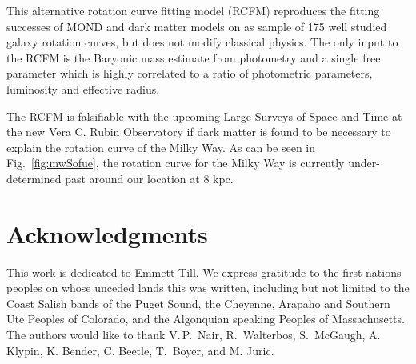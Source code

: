 \documentclass[reprint,%
 amsmath,amssymb,
 aps,
]{revtex4-1}
\begin{document}
  This alternative rotation curve fitting model (RCFM)   reproduces the fitting successes of MOND and dark matter models on as  sample of   175  well studied galaxy rotation curves\cite{2016Lelli}, but does not   modify classical  physics. The only input to the RCFM is the  Baryonic mass estimate from  photometry and a single  
 free    parameter  which is  highly correlated to a ratio of photometric parameters,     luminosity and effective radius. 
 
 
The RCFM is   falsifiable with the upcoming Large  Surveys of Space and Time  at the new Vera C. Rubin Observatory \cite{Ivezić_2019,2022ApJS..259...35A,2010ApJ...716....1B,de_Blok_2010} 
if dark matter is found to be necessary to explain  the rotation curve of the Milky Way. 
As can be seen in Fig.~\ref{fig:mwSofue}, 
the rotation curve   for  the Milky Way  is currently under-determined  past around our location at $8$ kpc.  


 
  
 
 
 
 
 
  
  
   

  \section[]{Acknowledgments}
 This work is dedicated to Emmett Till. We express     gratitude to the first nations peoples on whose unceded lands this was written, including but not limited to  the Coast Salish bands of the Puget Sound, 
 the Cheyenne, Arapaho and Southern Ute  Peoples of Colorado, and the Algonquian speaking  Peoples of Massachusetts. 
  The authors would like to thank    V.\,P.\,  Nair,   R.\, Walterbos, S.\ McGaugh,  A.\, Klypin, K. Bender, C. Beetle,     T.\, Boyer, and M. Juric.   \\
  
\end{document}
